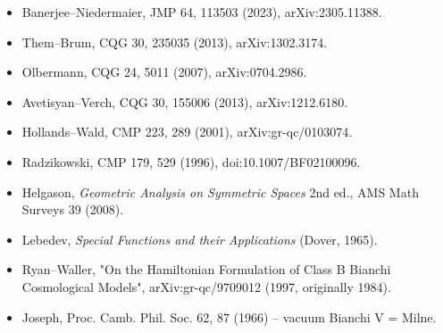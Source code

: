 \documentclass[11pt,a4paper]{article}
\theoremstyle{definition}
\begin{document}
\begin{itemize}
\item Banerjee--Niedermaier, JMP 64, 113503 (2023), arXiv:2305.11388.
\item Them--Brum, CQG 30, 235035 (2013), arXiv:1302.3174.
\item Olbermann, CQG 24, 5011 (2007), arXiv:0704.2986.
\item Avetisyan--Verch, CQG 30, 155006 (2013), arXiv:1212.6180.
\item Hollands--Wald, CMP 223, 289 (2001), arXiv:gr-qc/0103074.
\item Radzikowski, CMP 179, 529 (1996), doi:10.1007/BF02100096.
\item Helgason, \emph{Geometric Analysis on Symmetric Spaces} 2nd ed.,
  AMS Math Surveys 39 (2008).
\item Lebedev, \emph{Special Functions and their Applications} (Dover, 1965).
\item Ryan--Waller, "On the Hamiltonian Formulation of Class B Bianchi
  Cosmological Models", arXiv:gr-qc/9709012 (1997, originally 1984).
\item Joseph, Proc. Camb. Phil. Soc. 62, 87 (1966) -- vacuum Bianchi V = Milne.
\end{itemize}
\end{document}
